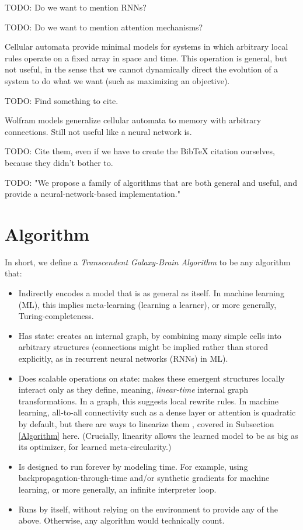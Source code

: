 \documentclass{article}
\begin{document}
    TODO: Do we want to mention RNNs?

    TODO: Do we want to mention attention mechanisms?

Cellular automata provide minimal models for systems in which arbitrary local rules operate on a fixed array in space and time. This operation is general, but not useful, in the sense that we cannot dynamically direct the evolution of a system to do what we want (such as maximizing an objective).

    TODO: Find something to cite.

Wolfram models generalize cellular automata to memory with arbitrary connections. Still not useful like a neural network is.

    TODO: Cite them, even if we have to create the BibTeX citation ourselves, because they didn't bother to.

    TODO: "We propose a family of algorithms that are both general and useful, and provide a neural-network-based implementation."

\section{Algorithm}

In short, we define a \textit{Transcendent Galaxy-Brain Algorithm} to be any algorithm that:

\begin{itemize}
\item Indirectly encodes a model that is as general as itself. In machine learning (ML), this implies meta-learning (learning a learner), or more generally, Turing-completeness.
\item Has state: creates an internal graph, by combining many simple cells into arbitrary structures (connections might be implied rather than stored explicitly, as in recurrent neural networks (RNNs) in ML).
\item Does scalable operations on state: makes these emergent structures locally interact only as they define, meaning, \textit{linear-time} internal graph transformations. In a graph, this suggests local rewrite rules. In machine learning, all-to-all connectivity such as a dense layer or attention is quadratic by default, but there are ways to linearize them \cite{tolstikhin2021mlpmixer} \cite{schlag2021linear}, covered in Subsection \ref{Algorithm} here. (Crucially, linearity allows the learned model to be as big as its optimizer, for learned meta-circularity.)
\item Is designed to run forever by modeling time. For example, using backpropagation-through-time and/or synthetic gradients for machine learning, or more generally, an infinite interpreter loop.
\item Runs by itself, without relying on the environment to provide any of the above. Otherwise, any algorithm would technically count.
\end{itemize}
\end{document}
